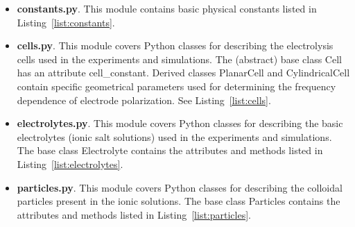  \begin{itemize}
	\item \textbf{constants.py}. This module contains basic physical constants listed in Listing~\ref{list:constants}.
\end{itemize}

% 
 
 \begin{itemize}
     \item \textbf{cells.py}. This module covers Python classes for describing the electrolysis cells used in the experiments and simulations. The (abstract) base class \textsf{Cell} has an attribute \textsf{cell\_constant}. Derived classes \textsf{PlanarCell} and \textsf{CylindricalCell} contain specific geometrical parameters used for determining the frequency dependence of electrode polarization. See Listing~\ref{list:cells}.
 \end{itemize}
 
% 

 \begin{itemize}
     \item \textbf{electrolytes.py}. This module covers Python classes for describing the basic electrolytes (ionic salt solutions) used in the experiments and simulations. The base class \textsf{Electrolyte} contains the attributes and methods listed in Listing~\ref{list:electrolytes}.
 \end{itemize}
 
% 

 \begin{itemize}
     \item \textbf{particles.py}. This module covers Python classes for describing the colloidal particles present in the ionic solutions. The base class \textsf{Particles} contains the attributes and methods listed in Listing~\ref{list:particles}.
 \end{itemize}
 
% 

